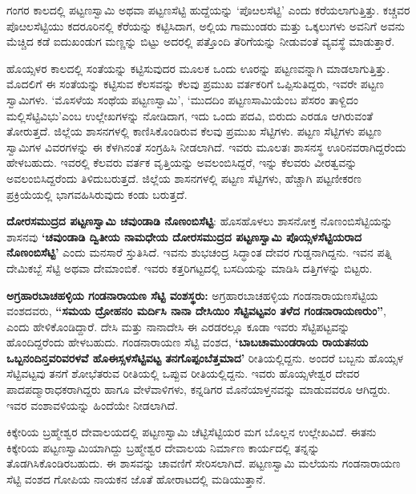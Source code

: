 ಗಂಗರ ಕಾಲದಲ್ಲಿ ಪಟ್ಟಣಸ್ವಾಮಿ ಅಥವಾ ಪಟ್ಟಣಸೆಟ್ಟಿ ಹುದ್ದೆಯನ್ನು ‘ಪೊೞಲಸೆಟ್ಟಿ’ ಎಂದು ಕರೆಯಲಾಗುತ್ತಿತ್ತು. ಕಚ್ಚವರ ಪೊೞಲಸೆಟ್ಟಿಯು ಕದರೂರಿನಲ್ಲಿ ಕೆರೆಯನ್ನು ಕಟ್ಟಿಸಿದಾಗ, ಅಲ್ಲಿಯ ಗಾಮುಂಡರು ಮತ್ತು ಒಕ್ಕಲುಗಳು ಅವನಿಗೆ ಅವನು ಮೆಚ್ಚಿದ ಕಡೆ ಐದುಖಂಡುಗ ಮಣ್ಣನ್ನು ಬಿಟ್ಟು ಅದರಲ್ಲಿ ಪತ್ತೊಂದಿ ತೆರಿಗೆಯನ್ನು ನೀಡುವಂತೆ ವ್ಯವಸ್ಥೆ ಮಾಡುತ್ತಾರೆ.

ಹೊಯ್ಸಳರ ಕಾಲದಲ್ಲಿ ಸಂತೆಯನ್ನು ಕಟ್ಟಿಸುವುದರ ಮೂಲಕ ಒಂದು ಊರನ್ನು ಪಟ್ಟಣವನ್ನಾಗಿ ಮಾಡಲಾಗುತ್ತಿತ್ತು. ಮೊದಲಿಗೆ ಈ ಸಂತೆಯನ್ನು ಕಟ್ಟಿಸುವ ಕೆಲಸವನ್ನು ಕೆಲವು ಪ್ರಮುಖ ವರ್ತಕರಿಗೆ ಒಪ್ಪಿಸುತಿದ್ದರು, ಇವರೇ ಪಟ್ಟಣ ಸ್ವಾಮಿಗಳು. ‘ಮೊಸಳೆಯ ಸಂಥೆಯ ಪಟ್ಟಣಸ್ವಾಮಿ’, ‘ಮುದದಿಂ ಪಟ್ಟಣಸಾಮಿಯೆಂಬ ಪೆಸರಂ ತಾಳ್ದಿದಂ ಮಲ್ಲಿಸೆಟ್ಟಿವಿಭು’ಎಂಬ ಉಲ್ಲೇಖಗಳನ್ನು ನೋಡಿದಾಗ, ಇದು ಒಂದು ಪದವಿ, ಬಿರುದು ಎರಡೂ ಆಗಿರುವಂತೆ ತೋರುತ್ತದೆ. ಜಿಲ್ಲೆಯ ಶಾಸನಗಳಲ್ಲಿ ಕಾಣಿಸಿಕೊಂಡಿರುವ ಕೆಲವು ಪ್ರಮುಖ ಸೆಟ್ಟಿಗಳು. ಪಟ್ಟಣ ಸೆಟ್ಟಿಗಳು ಪಟ್ಟಣ ಸ್ವಾಮಿಗಳ ವಿವರಗಳನ್ನು ಈ ಕೆಳಗಿನಂತೆ ಸಂಗ್ರಹಿಸಿ ನೀಡಲಾಗಿದೆ. ಇವರು ಮೂಲತಃ ಶಾಸನಸ್ಥ ಊರಿನವರಾಗಿದ್ದರೆಂದು ಹೇಳಬಹುದು. ಇವರಲ್ಲಿ ಕೆಲವರು ವರ್ತಕ ವೃತ್ತಿಯನ್ನು ಅವಲಂಬಿಸಿದ್ದರೆ, ಇನ್ನು ಕೆಲವರು ವೀರತ್ವವನ್ನು ಅವಲಂಬಿಸಿದ್ದರೆಂದು ತಿಳಿದುಬರುತ್ತದೆ. ಜಿಲ್ಲೆಯ ಶಾಸನಗಳಲ್ಲಿ ಪಟ್ಟಣ ಸೆಟ್ಟಿಗಳು, ಹೆಚ್ಚಾಗಿ ಪಟ್ಟಣೀಕರಣ ಪ್ರಕ್ರಿಯೆಯಲ್ಲಿ ಭಾಗವಹಿಸಿರುವುದು ಕಂಡು ಬರುತ್ತದೆ.

\textbf{ದೋರಸಮುದ್ರದ ಪಟ್ಟಣಸ್ವಾಮಿ ಚವುಂಡಾಡಿ ನೊಣಂಬಿಸೆಟ್ಟಿ}: ಹೊಸಹೊಳಲು ಶಾಸನೋಕ್ತ ನೊಣಂಬಿಸೆಟ್ಟಿಯನ್ನು ಶಾಸನವು \textbf{‘ಚವುಂಡಾಡಿ ದ್ವಿತೀಯ ನಾಮಧೇಯ ದೋರಸಮುದ್ರದ ಪಟ್ಟಣಸ್ವಾಮಿ ಪೊಯ್ಸಳಸೆಟ್ಟಿಯರಾದ ನೊಣಂಬಿಸೆಟ್ಟಿ’} ಎಂದು ಮನಸಾರೆ ಸ್ತುತಿಸಿದೆ. ಇವನು ಶುಭಚಂದ್ರ ಸಿದ್ಧಾಂತ ದೇವರ ಗುಡ್ಡನಾಗಿದ್ದನು. ಇವನ ಪತ್ನಿ ದೇಮಿಕಬ್ಬೆ ಸೆಟ್ಟಿ ಅಥವಾ ದೇಮಾಂಬಿಕೆ. ಇವರು ಕತ್ತರಿಗಟ್ಟದಲ್ಲಿ ಬಸದಿಯನ್ನು ಮಾಡಿಸಿ ದತ್ತಿಗಳನ್ನು ಬಿಟ್ಟರು.

\textbf{ಅಗ್ರಹಾರಬಾಚಹಳ್ಳಿಯ ಗಂಡನಾರಾಯಣ ಸೆಟ್ಟಿ ವಂಶಸ್ಥರು: } ಅಗ್ರಹಾರಬಾಚಹಳ್ಳಿಯ ಗಂಡನಾರಾಯಣಸೆಟ್ಟಿಯ ವಂಶದವರು, \textbf{“ಸಮಯ ದ್ರೋಹನಂ ಮರ್ದಿಸಿ ನಾನಾ ದೇಸಿಯಿಂ ಸೆಟ್ಟಿವಟ್ಟವಂ ತಳೆದ ಗಂಡನಾರಾಯಣರುಂ”}, ಎಂದು ಹೇಳಿಕೊಂಡಿದ್ದಾರೆ. ದೇಸಿ ಮತ್ತು ನಾನಾದೇಸಿ ಈ ಎರಡರಲ್ಲೂ ಕೂಡಾ ಇವರು ಸೆಟ್ಟಿಪಟ್ಟವನ್ನು ಹೊಂದಿದ್ದರೆಂದು ಹೇಳಬಹುದು. ಗಂಡನಾರಾಯಣ ಸೆಟ್ಟಿ ವಂಶದ, \textbf{‘ಬಾಬಚಾಮುಂಡರಾಯ ರಾಯತನಯ ಒಬ್ಬನಂದಿನ್ತವರಿವರಳವೆ ಹೊಈಸ್ಸಳಸೆಟ್ಟಿವಟ್ಟ ತನಗೊಪ್ಪಂಬೆತ್ತಮಾದ’} ರೀತಿಯಲ್ಲಿದ್ದನು. ಅಂದರೆ ಬಬ್ಬನು ಹೊಯ್ಸಳ ಸೆಟ್ಟಿವಟ್ಟವು ತನಗೆ ಶೋಭೆತರುವ ರೀತಿಯಲ್ಲಿ ಒಪ್ಪುವ ರೀತಿಯಲ್ಲಿದ್ದನು. ಇವರು ಹೊಯ್ಸಳೇಶ್ವರ ದೇವರ ಪಾದಪದ್ಮಾರಾಧಕರಾಗಿದ್ದರು ಹಾಗೂ ವೇಳೆವಾಳಿಗಳು, ಕನ್ನಡಿಗರ ಮೊನೆಯಾಳ್ತನವನ್ನು ಮಾಡುವವರೂ ಆಗಿದ್ದರು. ಇವರ ವಂಶಾವಳಿಯನ್ನು ಹಿಂದೆಯೇ ನೀಡಲಾಗಿದೆ.

ಕಿಕ್ಕೇರಿಯ ಬ್ರಹ್ಮೇಶ್ವರ ದೇವಾಲಯದಲ್ಲಿ ಪಟ್ಟಣಸ್ವಾಮಿ ಚೆಟ್ಟಿಸೆಟ್ಟಿಯರ ಮಗ ಬೊಲ್ಲನ ಉಲ್ಲೇಖವಿದೆ. ಈತನು ಕಿಕ್ಕೇರಿಯ ಪಟ್ಟಣಸ್ವಾಮಿಯಾಗಿದ್ದು ಬ್ರಹ್ಮೇಶ್ವರ ದೇವಾಲಯ ನಿರ್ಮಾಣ ಕಾರ್ಯದಲ್ಲಿ ತನ್ನನ್ನು ತೊಡಗಿಸಿಕೊಂಡಿರಬಹುದು. ಈ ಶಾಸವನ್ನು ಚಾವಣಿಗೆ ಸೇರಿಸಲಾಗಿದೆ. ಪಟ್ಟಣಸ್ವಾಮಿ ಮಲೆಯನು ಗಂಡನಾರಾಯಣ ಸೆಟ್ಟಿ ವಂಶದ ಗೋಪಿಯ ನಾಯಕನ ಜೊತೆ ಹೋರಾಟದಲ್ಲಿ ಮಡಿಯುತ್ತಾನೆ.

